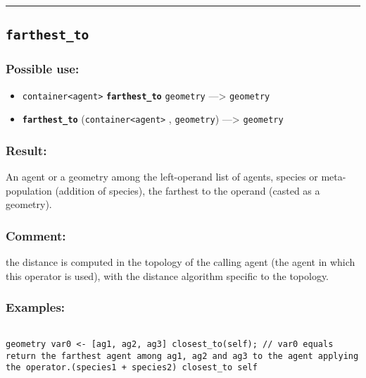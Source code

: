 \documentclass[]{book}
\providecommand{\tightlist}{%
  \setlength{\itemsep}{0pt}\setlength{\parskip}{0pt}}
\theoremstyle{definition}
\theoremstyle{definition}
\theoremstyle{definition}
\theoremstyle{remark}
\begin{document}
\begin{center}\rule{0.5\linewidth}{\linethickness}\end{center}

\subsection{\texorpdfstring{\texttt{farthest\_to}}{farthest\_to}}\label{farthest_to}

\subsubsection{Possible use:}\label{possible-use-163}

\begin{itemize}
\tightlist
\item
  \texttt{container\textless{}agent\textgreater{}}
  \textbf{\texttt{farthest\_to}} \texttt{geometry} ---\textgreater{}
  \texttt{geometry}
\item
  \textbf{\texttt{farthest\_to}}
  (\texttt{container\textless{}agent\textgreater{}} , \texttt{geometry})
  ---\textgreater{} \texttt{geometry}
\end{itemize}

\subsubsection{Result:}\label{result-157}

An agent or a geometry among the left-operand list of agents, species or
meta-population (addition of species), the farthest to the operand
(casted as a geometry).

\subsubsection{Comment:}\label{comment-35}

the distance is computed in the topology of the calling agent (the agent
in which this operator is used), with the distance algorithm specific to
the topology.

\subsubsection{Examples:}\label{examples-122}

\begin{verbatim}
 
geometry var0 <- [ag1, ag2, ag3] closest_to(self); // var0 equals return the farthest agent among ag1, ag2 and ag3 to the agent applying the operator.(species1 + species2) closest_to self 
\end{verbatim}
\end{document}
